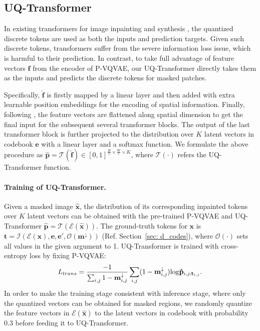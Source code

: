 \documentclass[10pt,twocolumn,letterpaper]{article}
\newcommand{\Sref}[1]{Section~\ref{#1}}
\begin{document}
\subsection{UQ-Transformer}
\label{sec: ut_transformer}
In existing transformers for image inpainting \cite{wan2021high} and synthesis \cite{esser2021taming, ramesh2021zero}, the quantized discrete tokens are used as both the inputs and prediction targets. Given such discrete tokens, transformers
suffer from the severe information loss issue, which is harmful to their prediction.
In contrast, to take full advantage of feature vectors $\mathbf{\hat{f}}$ from the encoder of P-VQVAE, our UQ-Transformer directly takes them as the inputs and predicts the discrete tokens for masked patches.

Specifically, $\mathbf{\hat{f}}$ is firstly mapped by a linear layer and then added with extra learnable position embeddings for the encoding of spatial information. Finally, following \cite{radford2019language}, the feature vectors are flattened along spatial dimension to get the final input for the subsequent several transformer blocks.
The output of the last transformer block is further projected to the distribution over $K$ latent vectors in codebook $\mathbf{e}$ with a linear layer and a softmax function. We formulate the above procedure as $\mathbf{\hat{p}} = \mathcal{T}(\mathbf{\hat{f}}) \in [0, 1]^{\frac{H}{r}\times \frac{W}{r} \times K}$, where $\mathcal{T}(\cdot)$ refers the UQ-Transformer function. 





\paragraph{Training of UQ-Transformer.}
Given a masked image $\mathbf{\hat{x}}$, the distribution of its corresponding inpainted tokens over $K$ latent vectors can be obtained with the pre-trained P-VQVAE and UQ-Transformer $\mathbf{\hat{p}} = \mathcal{T}(\mathcal{E}(\mathbf{\hat{x}}))$.
The ground-truth tokens for $\mathbf{x}$ is $\mathbf{t} = \mathcal{I}(\mathcal{E}(\mathbf{x}), \mathbf{e}, \mathbf{e'}, \mathcal{O}(\mathbf{m}^{\downarrow}))$  (Ref. \Sref{sec: d_codes}), where $\mathcal{O}(\cdot)$ sets all values in the given argument to 1. 
UQ-Transformer is trained with cross-entropy loss by fixing P-VQVAE:
\begin{equation}
\begin{aligned}
    L_{trans} = \frac{-1}{\sum_{i,j} 1 - \mathbf{m}_{i,j}^{\downarrow}} \sum_{i,j} (1-\mathbf{m}^{\downarrow}_{i,j}) {\rm log} \mathbf{\hat{p}}_{i,j,\mathbf{t}_{i,j}}.
\end{aligned}
\label{eq: ut_transformer_loss}
\end{equation}
In order to make the training stage consistent with inference stage, where only the quantized vectors can be obtained for masked regions, we randomly quantize the feature vectors in $\mathcal{E}(\mathbf{\hat{x}})$ to the latent vectors in codebook with probability 0.3 before feeding it to UQ-Transformer. 
\end{document}
